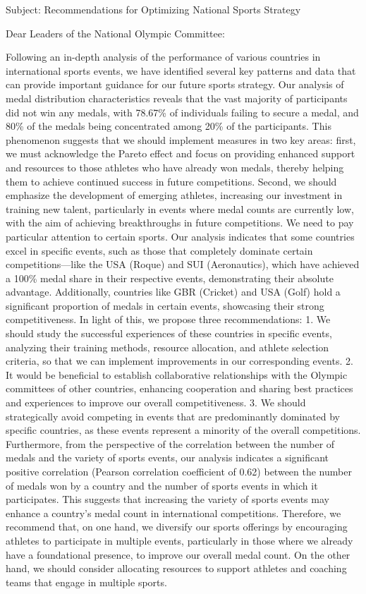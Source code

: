\documentclass{mcmthesis}
\begin{document}
\begin{letter}

Subject: Recommendations for Optimizing National Sports Strategy

Dear Leaders of the National Olympic Committee:

Following an in-depth analysis of the performance of various countries in international sports events, we have identified several key patterns and data that can provide important guidance for our future sports strategy.
Our analysis of medal distribution characteristics reveals that the vast majority of participants did not win any medals, with 78.67\% of individuals failing to secure a medal, and 80\% of the medals being concentrated among 20\% of the participants. This phenomenon suggests that we should implement measures in two key areas: first, we must acknowledge the Pareto effect and focus on providing enhanced support and resources to those athletes who have already won medals, thereby helping them to achieve continued success in future competitions. Second, we should emphasize the development of emerging athletes, increasing our investment in training new talent, particularly in events where medal counts are currently low, with the aim of achieving breakthroughs in future competitions.
We need to pay particular attention to certain sports. Our analysis indicates that some countries excel in specific events, such as those that completely dominate certain competitions—like the USA (Roque) and SUI (Aeronautics), which have achieved a 100\% medal share in their respective events, demonstrating their absolute advantage. Additionally, countries like GBR (Cricket) and USA (Golf) hold a significant proportion of medals in certain events, showcasing their strong competitiveness. In light of this, we propose three recommendations:
1. We should study the successful experiences of these countries in specific events, analyzing their training methods, resource allocation, and athlete selection criteria, so that we can implement improvements in our corresponding events.
2. It would be beneficial to establish collaborative relationships with the Olympic committees of other countries, enhancing cooperation and sharing best practices and experiences to improve our overall competitiveness.
3. We should strategically avoid competing in events that are predominantly dominated by specific countries, as these events represent a minority of the overall competitions.
Furthermore, from the perspective of the correlation between the number of medals and the variety of sports events, our analysis indicates a significant positive correlation (Pearson correlation coefficient of 0.62) between the number of medals won by a country and the number of sports events in which it participates. This suggests that increasing the variety of sports events may enhance a country's medal count in international competitions. Therefore, we recommend that, on one hand, we diversify our sports offerings by encouraging athletes to participate in multiple events, particularly in those where we already have a foundational presence, to improve our overall medal count. On the other hand, we should consider allocating resources to support athletes and coaching teams that engage in multiple sports.

\end{letter}
\end{document}
